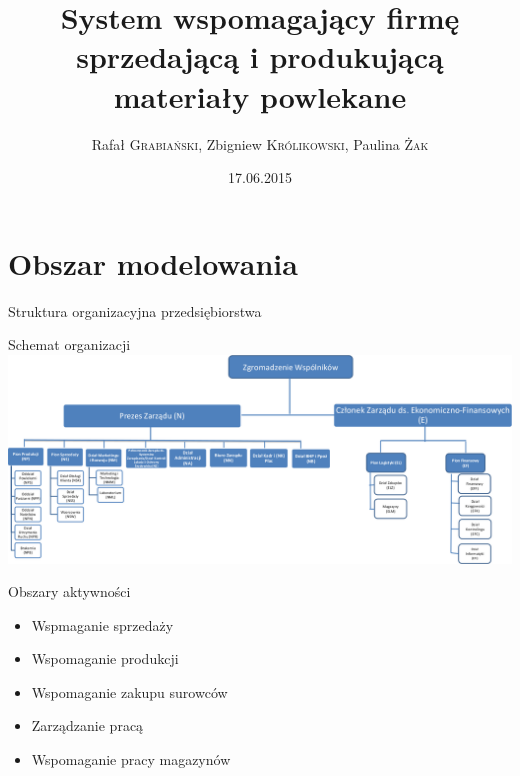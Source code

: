 \documentclass{beamer}
\title[SKORKA]{System wspomagający firmę sprzedającą i produkującą materiały powlekane}
\author{Rafał \textsc{Grabiański}, Zbigniew \textsc{Królikowski}, Paulina \textsc{Żak}}
\institute{}
\date{17.06.2015}
\begin{document}
\begin{frame}
  \titlepage
\end{frame}


\section{Obszar modelowania}

\begin{frame}{Struktura organizacyjna przedsiębiorstwa}

\begin{block}{Schemat organizacji}
\centering
\includegraphics[scale=0.25]{schemat.png}
\end{block}

\end{frame}

\begin{frame}{Obszary aktywności}

\begin{itemize}
\item Wspmaganie sprzedaży
\item Wspomaganie produkcji
\item Wspomaganie zakupu surowców
\item Zarządzanie pracą
\item Wspomaganie pracy magazynów
\end{itemize}

\end{frame}
\end{document}

